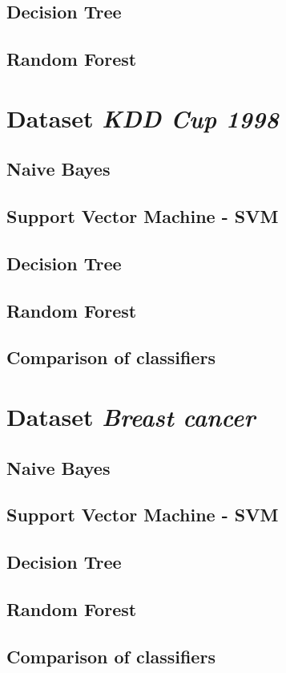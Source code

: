 \documentclass[11pt,a4paper,titlepage]{article}
\begin{document}
\subsection{Decision Tree}
\subsection{Random Forest}

\section{Dataset \textit{KDD Cup 1998}}
\subsection{Naive Bayes}
\subsection{Support Vector Machine - SVM}
\subsection{Decision Tree}
\subsection{Random Forest}
\subsection{Comparison of classifiers}

\section{Dataset \textit{Breast cancer}}
\subsection{Naive Bayes}
\subsection{Support Vector Machine - SVM}
\subsection{Decision Tree}
\subsection{Random Forest}
\subsection{Comparison of classifiers}
\end{document}
